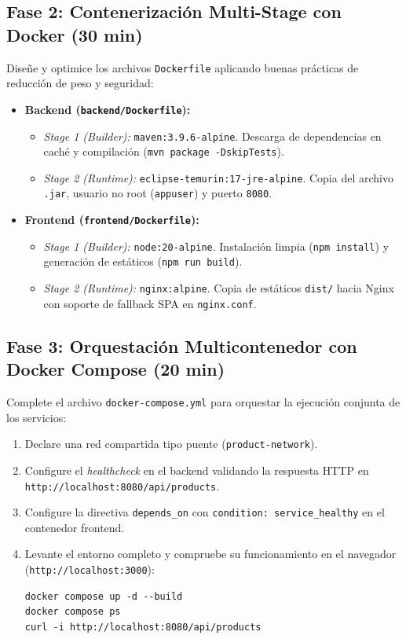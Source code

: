 \documentclass[10pt,letterpaper]{article}
\begin{document}
\subsection{Fase 2: Contenerización Multi-Stage con Docker (30 min)}
Diseñe y optimice los archivos \texttt{Dockerfile} aplicando buenas prácticas de reducción de peso y seguridad:
\begin{itemize}[leftmargin=*,itemsep=2.5pt,topsep=2pt]
  \item \textbf{Backend (\texttt{backend/Dockerfile}):}
    \begin{itemize}[itemsep=1pt]
      \item \textit{Stage 1 (Builder):} \texttt{maven:3.9.6-alpine}. Descarga de dependencias en caché y compilación (\texttt{mvn package -DskipTests}).
      \item \textit{Stage 2 (Runtime):} \texttt{eclipse-temurin:17-jre-alpine}. Copia del archivo \texttt{.jar}, usuario no root (\texttt{appuser}) y puerto \texttt{8080}.
    \end{itemize}
  \item \textbf{Frontend (\texttt{frontend/Dockerfile}):}
    \begin{itemize}[itemsep=1pt]
      \item \textit{Stage 1 (Builder):} \texttt{node:20-alpine}. Instalación limpia (\texttt{npm install}) y generación de estáticos (\texttt{npm run build}).
      \item \textit{Stage 2 (Runtime):} \texttt{nginx:alpine}. Copia de estáticos \texttt{dist/} hacia Nginx con soporte de fallback SPA en \texttt{nginx.conf}.
    \end{itemize}
\end{itemize}

\subsection{Fase 3: Orquestación Multicontenedor con Docker Compose (20 min)}
Complete el archivo \texttt{docker-compose.yml} para orquestar la ejecución conjunta de los servicios:
\begin{enumerate}[leftmargin=*,label=\textbf{\alph*)},itemsep=2pt,topsep=2pt]
  \item Declare una red compartida tipo puente (\texttt{product-network}).
  \item Configure el \textit{healthcheck} en el backend validando la respuesta HTTP en \texttt{http://localhost:8080/api/products}.
  \item Configure la directiva \texttt{depends\_on} con \texttt{condition: service\_healthy} en el contenedor frontend.
  \item Levante el entorno completo y compruebe su funcionamiento en el navegador (\texttt{http://localhost:3000}):
  \begin{lstlisting}[style=bashstyle]
docker compose up -d --build
docker compose ps
curl -i http://localhost:8080/api/products
  \end{lstlisting}
\end{enumerate}
\end{document}
